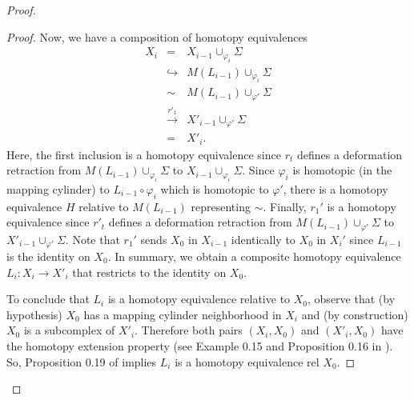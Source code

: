 \documentclass[11pt,letterpaper]{amsart}
\begin{document}
\begin{proof}
\begin{proof}
Now, we have a composition of homotopy equivalences
\begin{eqnarray*}
X_i&=&%
X_{i-1}\cup_{\varphi_i}\Sigma\\%
&\hookrightarrow&M(L_{i-1})\cup_{\varphi_i}\Sigma\\%
&\sim&M(L_{i-1})\cup_{\varphi'}\Sigma\\%
&\stackrel{r'_1}\rightarrow&X'_{i-1}\cup_{\varphi'}\Sigma\\
&=&X'_i.%
\end{eqnarray*}
Here, the first inclusion is a homotopy equivalence since $r_t$ defines a deformation retraction from $M(L_{i-1})\cup_{\varphi_i}\Sigma$ to $X_{i-1}\cup_{\varphi_i}\Sigma$.
Since $\varphi_i$ is homotopic (in the mapping cylinder) to $L_{i-1}\circ\varphi_i$ which is homotopic to $\varphi'$, there is a homotopy equivalence $H$ relative to $M(L_{i-1})$ representing $\sim$.
Finally, $r_1'$ is a homotopy equivalence since $r'_t$ defines a deformation retraction from $M(L_{i-1})\cup_{\varphi'}\Sigma$ to $X'_{i-1}\cup_{\varphi'}\Sigma$. Note that $r_1'$ sends $X_0$ in $X_{i-1}$ identically to $X_0$ in $X_i'$ since $L_{i-1}$ is the identity on $X_0$. In summary, we obtain a composite homotopy equivalence $L_i:X_i\rightarrow X'_i$ that restricts to the identity on $X_0.$

To conclude that $L_i$ is a homotopy equivalence relative to $X_0$, observe that (by hypothesis) $X_0$ has a mapping cylinder neighborhood in $X_i$ and (by construction) $X_0$ is a subcomplex of $X'_i$. Therefore both pairs $(X_i,X_0)$ and $(X'_i,X_0)$ have the homotopy extension property (see Example 0.15 and Proposition 0.16 in \cite{hatcherbook}). So, Proposition 0.19 of \cite{hatcherbook} implies $L_i$ is a homotopy equivalence rel $X_0$. 
\end{proof}
\end{proof}
\end{document}
